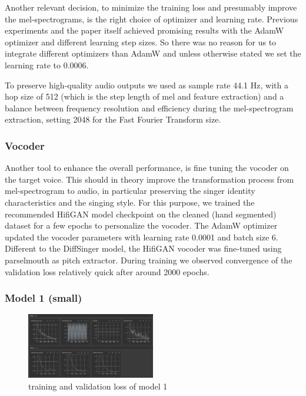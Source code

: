 \documentclass[a4paper]{article}
\begin{document}
	Another relevant decision, to minimize the training loss and presumably improve the mel-spectrograms, is the right choice of optimizer and learning rate. Previous experiments and the paper itself achieved promising results with the AdamW optimizer and different learning step sizes. So there was no reason for us to integrate different optimizers than AdamW and unless otherwise stated we set the learning rate to 0.0006. 
	
	To preserve high-quality audio outputs we used as sample rate 44.1 Hz, with a hop size of 512 (which is the step length of mel and feature extraction) and a balance between frequency resolution and efficiency during the mel-spectrogram extraction, setting 2048 for the Fast Fourier Transform size.
	
	\subsubsection{Vocoder}
	
	Another tool to enhance the overall performance, is fine tuning the vocoder on the target voice. This should in theory improve the transformation process from mel-spectrogram to audio, in particular preserving the singer identity characteristics and the singing style. For this purpose, we trained the recommended HifiGAN model checkpoint on the cleaned (hand segmented) dataset for a few epochs to personalize the vocoder. The AdamW optimizer updated the vocoder parameters with learning rate 0.0001 and batch size 6. Different to the DiffSinger model, the HifiGAN vocoder was fine-tuned using parselmouth as pitch extractor. During training we observed convergence of the validation loss relatively quick after around 2000 epochs. 
	
	\subsubsection{Model 1 (small)}
	
	\begin{figure}[htbp]
		\centering
		\includegraphics[width=0.5\textwidth]{graphics/v1_training+testing.png}
		\caption{training and validation loss of model 1}
		\label{fig:model1}
	\end{figure}
	
\end{document}
